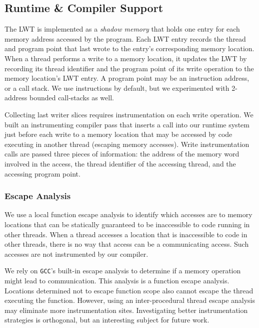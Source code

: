 \documentclass[preprint,9pt]{sigplanconf}
\newcommand{\lwt}{LWT\xspace}
\begin{document}

\subsection{Runtime \& Compiler Support}
 The \lwt is implemented as a {\em shadow memory} that holds one entry for
each memory address accessed by the program.  Each \lwt entry records the
thread and program point that last wrote to the entry's corresponding memory
location.  When a thread performs a write to a memory location, it updates the
\lwt by recording its thread identifier and the program point of its write
operation to the memory location's \lwt entry.  A program point may be an
instruction address, or a call stack.  We use instructions by default, but we experimented with 2-address bounded call-stacks as well.   

Collecting last writer slices requires instrumentation on each write operation.
We built an instrumenting compiler pass that inserts a call into our runtime
system just before each write to a memory location that may be accessed by code
executing in another thread (escaping memory accesses).  Write instrumentation
calls are passed three pieces of information: the address of the memory word
involved in the access, the thread identifier of the accessing thread, and the
accessing program point.   

\subsubsection{Escape Analysis}
We use a local function escape analysis to identify which accesses are to
memory locations that can be statically guaranteed to be inaccessible to code
running in other threads.  When a thread accesses a location that is
inaccessible to code in other threads, there is no way that access can be a
communicating access.  Such accesses are not instrumented by our compiler.  

We rely on {\tt GCC}'s built-in escape analysis to determine if a memory
operation might lead to communication.  This analysis is a function escape
analysis.  Locations determined not to escape function scope also cannot escape
the thread executing the function.  However, using an inter-procedural thread
escape analysis may eliminate more instrumentation sites.  Investigating better
instrumentation strategies is orthogonal, but an interesting subject for future
work.
\end{document}
